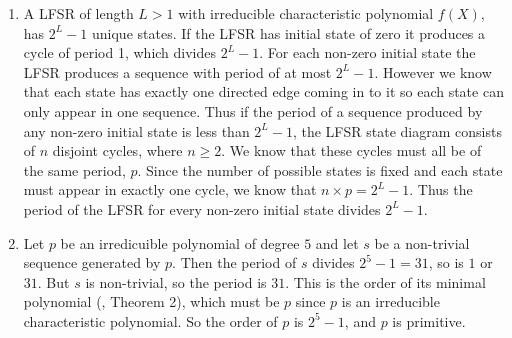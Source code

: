 \begin{enumerate}

\item A LFSR of length $L > 1$ with irreducible characteristic polynomial $f(X)$, has $2^{L}-1$ unique states. If the LFSR has initial state of zero it produces a cycle of period 1, which divides $2^{L}-1$. For each non-zero initial state the LFSR produces a sequence with period of at most $2^{L}-1$. However we know that each state has exactly one directed edge coming in to it so each state can only appear in one sequence. Thus if the period of a sequence produced by any non-zero initial state is less than $2^{L}-1$, the LFSR state diagram consists of $n$ disjoint cycles, where $n \geq 2$. We know that these cycles must all be of the same period, $p$. Since the number of possible states is fixed and each state must appear in exactly one cycle, we know that $n \times p = 2^{L}-1$. Thus the period of the LFSR for every non-zero initial state divides $2^{L}-1$.

\item Let $p$ be an irredicuible polynomial of degree $5$ and let $s$ be a non-trivial
sequence generated by $p$. Then the period of $s$ divides $2^5-1=31$, so is $1$ or $31$.
But $s$ is non-trivial, so the period is $31$. This is the order of its minimal polynomial
(\cite{slides}, Theorem 2), which must be $p$ since $p$ is an irreducible characteristic
polynomial. So the order of $p$ is $2^5-1$, and $p$ is primitive.

\end{enumerate}
